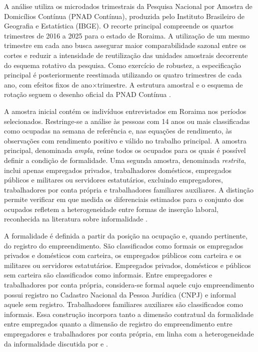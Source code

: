 \documentclass[12pt]{article}
\begin{document}
A análise utiliza os microdados trimestrais da Pesquisa Nacional por Amostra de
Domicílios Contínua (PNAD Contínua), produzida pelo Instituto Brasileiro de
Geografia e Estatística (IBGE). O recorte principal compreende os quartos
trimestres de 2016 a 2025 para o estado de Roraima. A utilização de um mesmo
trimestre em cada ano busca assegurar maior comparabilidade sazonal entre os
cortes e reduzir a intensidade de reutilização das unidades amostrais decorrente
do esquema rotativo da pesquisa. Como exercício de robustez, a especificação
principal é posteriormente reestimada utilizando os quatro trimestres de
cada ano, com efeitos fixos de ano$\times$trimestre. A estrutura amostral e o
esquema de rotação seguem o desenho oficial da PNAD Contínua
\citep{ibge_pnadc_notas_metodologicas}.

A amostra inicial contém os indivíduos entrevistados em Roraima nos períodos
selecionados. Restringe-se a análise às pessoas com 14 anos ou mais
classificadas como ocupadas na semana de referência e, nas equações de
rendimento, às observações com rendimento positivo e válido no trabalho
principal. A amostra principal, denominada \textit{ampla}, reúne todos os
ocupados para os quais é possível definir a condição de formalidade. Uma segunda
amostra, denominada \textit{restrita}, inclui apenas empregados privados,
trabalhadores domésticos, empregados públicos e militares ou servidores
estatutários, excluindo empregadores, trabalhadores por conta própria e
trabalhadores familiares auxiliares. A distinção permite verificar em que
medida os diferenciais estimados para o conjunto dos ocupados refletem a
heterogeneidade entre formas de inserção laboral, reconhecida na literatura
sobre informalidade \citep{bargain2011,hirata2010b}.

A formalidade é definida a partir da posição na ocupação e, quando pertinente,
do registro do empreendimento. São classificados como formais os empregados
privados e domésticos com carteira, os empregados públicos com carteira e os
militares ou servidores estatutários. Empregados privados, domésticos e públicos
sem carteira são classificados como informais. Entre empregadores e
trabalhadores por conta própria, considera-se formal aquele cujo empreendimento
possui registro no Cadastro Nacional da Pessoa Jurídica (CNPJ) e informal aquele
sem registro. Trabalhadores familiares auxiliares são classificados como
informais. Essa construção incorpora tanto a dimensão contratual da formalidade
entre empregados quanto a dimensão de registro do empreendimento entre
empregadores e trabalhadores por conta própria, em linha com a heterogeneidade
da informalidade discutida por \citet{ulyssea2006} e \citet{ulyssea2018}.
\end{document}
